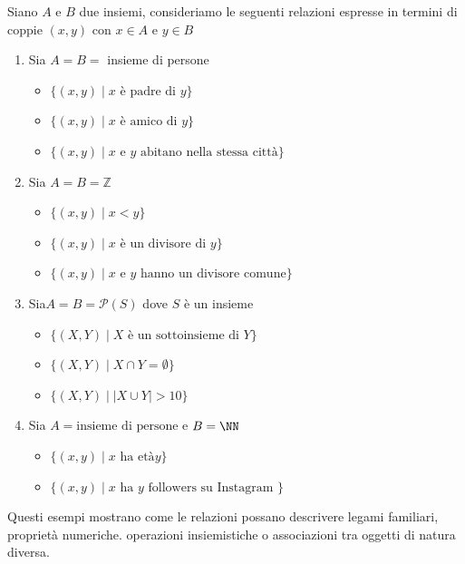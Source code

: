 \begin{esempio}
    Siano $A$ e $B$ due insiemi, consideriamo le seguenti relazioni espresse in termini di coppie $(x,y)$ con $x\in A$ e $y\in B$ 
\begin{enumerate}
    \item Sia $A=B=$  insieme di persone 
   
    \begin{itemize}
        \item  \( \{ (x, y) \mid x \text{ è padre di } y \} \)
        \item   \( \{ (x, y) \mid x \text{ è amico di } y \} \)
        \item   \( \{ (x, y) \mid x \text{ e } y  \text{ abitano nella stessa città} \}  \)
    \end{itemize}
    \item Sia $A=B=\mathbb{Z}$ 
    \begin{itemize}
        \item \(\bigl\{(x, y) \mid x < y \bigr\} \)
        \item\( \bigl\{(x, y) \mid x \text{ è un divisore di } y \bigr\} \)
        \item   \( \{ (x, y) \mid x \text{ e } y  \text{ hanno un divisore comune} \}\)
    \end{itemize}
    \item Sia\(A=B=\mathcal{P}(S)\) dove \(S\) è un insieme 
    \begin{itemize}
        \item \(\{ \left(X,Y\right) \mid X \text{ è un sottoinsieme di } Y\}\)
        \item \( \{ \left(X,Y\right) \mid X \cap Y = \emptyset\}\)
        \item \(\{\left(X,Y\right)\mid |X \cup Y|>10 \}\)
    \end{itemize}
    \item Sia $A=\text{insieme di persone}$ e $B= \NN$
    \begin{itemize}
        \item \(\{(x,y)\mid x \text{ ha età} y\}\)
         \item \(\{(x,y)\mid x \text{ ha } y \text{ followers su Instagram }\}\)
    \end{itemize}
\end{enumerate}
\end{esempio}

 Questi esempi mostrano come le relazioni possano descrivere legami familiari, proprietà numeriche. operazioni insiemistiche o  associazioni tra oggetti di natura diversa.

